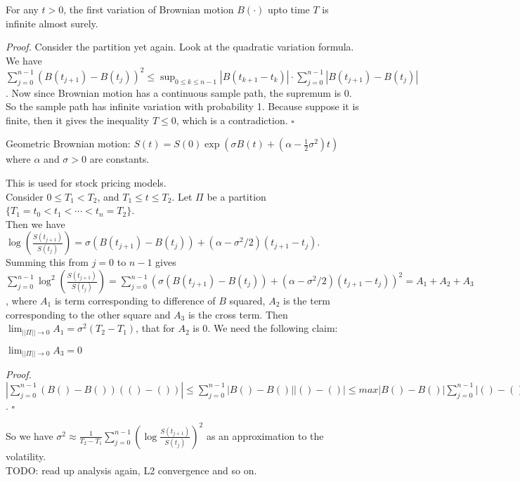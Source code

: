 \documentclass[a4paper]{article}
\newenvironment{proof}{\begin{breakbox}\textit{Proof.}}{\hfill$\square$\end{breakbox}}
\newcommand{\nl}{\vspace{0.2cm}\\}
\begin{document}
\begin{lemma}
    For any $t > 0$, the first variation of Brownian motion $B(\cdot)$ upto time $T$ is infinite almost surely.
\end{lemma}
\begin{proof}
    Consider the partition yet again. Look at the quadratic variation formula. We have $\sum_{j=0}^{n-1} (B(t_{j+1}) - B(t_j))^2 \le \sup_{0 \le k \le n - 1}|B(t_{k+1} - t_{k}
)| \cdot \sum_{j=0}^{n-1} |B(t_{j+1}) - B(t_j)|$. Now since Brownian motion has a continuous sample path, the supremum is $0$. So the sample path has infinite variation with probability 1.
Because suppose it is finite, then it gives the inequality $T \le 0$, which is a contradiction.
\end{proof}

\begin{defn}
Geometric Brownian motion:
$S(t) = S(0) \exp(\sigma B(t) + (\alpha - \frac{1}{2}\sigma^2) t)$ where $\alpha$ and $\sigma > 0$ are constants.
\end{defn}
This is used for stock pricing models.\nl
Consider $0 \le T_1 < T_2$, and $T_1 \le t \le T_2$. Let $\Pi$ be a partition $\{T_1 = t_0 < t_1 < \cdots < t_n = T_2\}$.\nl
Then we have $\log\left(\frac{S(t_{j+1})}{S(t_j)}\right) =
\sigma (B(t_{j+1}) - B(t_j)) + (\alpha - \sigma^2/2) (t_{j+1} - t_j)$.\nl
Summing this from $j = 0$ to $n - 1$ gives
$\sum_{j=0}^{n-1} \log^2\left(\frac{S(t_{j+1})}{S(t_j)}\right) = \sum_{j=0}^{n-1}
(\sigma (B(t_{j+1}) - B(t_j)) + (\alpha - \sigma^2/2) (t_{j+1} - t_j))^2 = A_1 + A_2 + A_3$, where $A_1$ is term corresponding to difference of $B$ squared, $A_2$ is the term corresponding to the
other square and $A_3$ is the cross term. Then $\lim_{||\Pi|| \to 0} A_1 = \sigma^2(T_2 - T_1)$, that for $A_2$ is $0$. We need the following claim:
\begin{claim}
$\lim_{||\Pi|| \to 0} A_3 = 0$
\end{claim}
\begin{proof}
    $|\sum_{j=0}^{n-1} (B() - B()) (() - ())| \le \sum_{j=0}^{n-1}|B() - B()||() - ()| \le max |B() - B()| \sum_{j=0}^{n-1}|() - ()| = 0 \cdot (T_2 - T_1)$. 
\end{proof}

So we have $\sigma^2 \approx \frac{1}{T_2 - T_1} \sum_{j=0}^{n-1} \left(\log \frac{S(t_{j+1})}{S(t_j)}\right)^2$ as an approximation to the volatility.\nl

TODO: read up analysis again, L2 convergence and so on.
\end{document}
